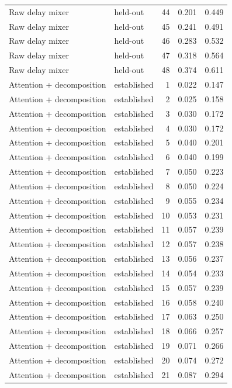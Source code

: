 \begin{tabular}{llrrr}
Raw delay mixer & held-out & 44 & 0.201 & 0.449 \\
Raw delay mixer & held-out & 45 & 0.241 & 0.491 \\
Raw delay mixer & held-out & 46 & 0.283 & 0.532 \\
Raw delay mixer & held-out & 47 & 0.318 & 0.564 \\
Raw delay mixer & held-out & 48 & 0.374 & 0.611 \\
Attention + decomposition & established & 1 & 0.022 & 0.147 \\
Attention + decomposition & established & 2 & 0.025 & 0.158 \\
Attention + decomposition & established & 3 & 0.030 & 0.172 \\
Attention + decomposition & established & 4 & 0.030 & 0.172 \\
Attention + decomposition & established & 5 & 0.040 & 0.201 \\
Attention + decomposition & established & 6 & 0.040 & 0.199 \\
Attention + decomposition & established & 7 & 0.050 & 0.223 \\
Attention + decomposition & established & 8 & 0.050 & 0.224 \\
Attention + decomposition & established & 9 & 0.055 & 0.234 \\
Attention + decomposition & established & 10 & 0.053 & 0.231 \\
Attention + decomposition & established & 11 & 0.057 & 0.239 \\
Attention + decomposition & established & 12 & 0.057 & 0.238 \\
Attention + decomposition & established & 13 & 0.056 & 0.237 \\
Attention + decomposition & established & 14 & 0.054 & 0.233 \\
Attention + decomposition & established & 15 & 0.057 & 0.239 \\
Attention + decomposition & established & 16 & 0.058 & 0.240 \\
Attention + decomposition & established & 17 & 0.063 & 0.250 \\
Attention + decomposition & established & 18 & 0.066 & 0.257 \\
Attention + decomposition & established & 19 & 0.071 & 0.266 \\
Attention + decomposition & established & 20 & 0.074 & 0.272 \\
Attention + decomposition & established & 21 & 0.087 & 0.294 \\

\end{tabular}
